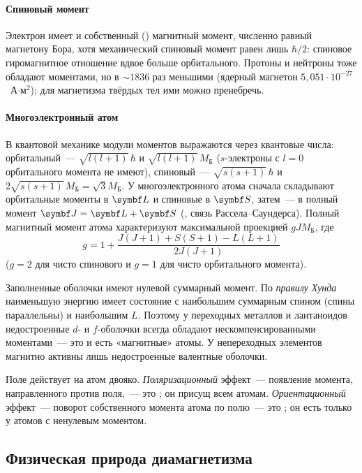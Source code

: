 \paragraph{Спиновый момент}
Электрон имеет и собственный () магнитный момент,
численно равный магнетону Бора, хотя механический спиновый момент
равен лишь $\hbar/2$: спиновое гиромагнитное отношение вдвое больше
орбитального. Протоны и нейтроны тоже обладают моментами, но в
$\sim1836$ раз меньшими (ядерный магнетон $5{,}051\cdot10^{-27}$~А$\cdot$м$^2$);
для магнетизма твёрдых тел ими можно пренебречь.

\paragraph{Многоэлектронный атом}
В квантовой механике модули моментов выражаются через квантовые числа:
орбитальный~— $\sqrt{l(l+1)}\,\hbar$ и $\sqrt{l(l+1)}\,M_\text{Б}$
($s$-электроны с $l=0$ орбитального момента не имеют), спиновый~—
$\sqrt{s(s+1)}\,\hbar$ и $2\sqrt{s(s+1)}\,M_\text{Б}=\sqrt3M_\text{Б}$. У
многоэлектронного атома сначала складывают орбитальные моменты в
$\vb L$ и спиновые в $\vb S$, затем~— в полный момент $\vb J=\vb L+\vb S$
(, связь Рассела--Саундерса). Полный магнитный момент
атома характеризуют максимальной проекцией $gJM_\text{Б}$, где
\begin{equation}\label{eq:lande}
g=1+\frac{J(J+1)+S(S+1)-L(L+1)}{2J(J+1)}
\end{equation}
 ($g=2$ для чисто спинового и $g=1$ для чисто
орбитального момента).

\begin{glavnoe}
Заполненные оболочки имеют нулевой суммарный момент. По \emph{правилу
Хунда} наименьшую энергию имеет состояние с наибольшим суммарным спином
(спины параллельны) и наибольшим $L$. Поэтому у переходных металлов и
лантаноидов недостроенные $d$- и $f$-оболочки всегда обладают
нескомпенсированными моментами~— это и есть «магнитные» атомы. У
непереходных элементов магнитно активны лишь недостроенные валентные
оболочки.
\end{glavnoe}

Поле действует на атом двояко. \emph{Поляризационный} эффект~—
появление момента, направленного против поля,~— это
; он присущ всем атомам. \emph{Ориентационный}
эффект~— поворот собственного момента атома по полю~— это
; он есть только у атомов с ненулевым моментом.

\subsection{Физическая природа диамагнетизма}\label{ssec:diamagn}

